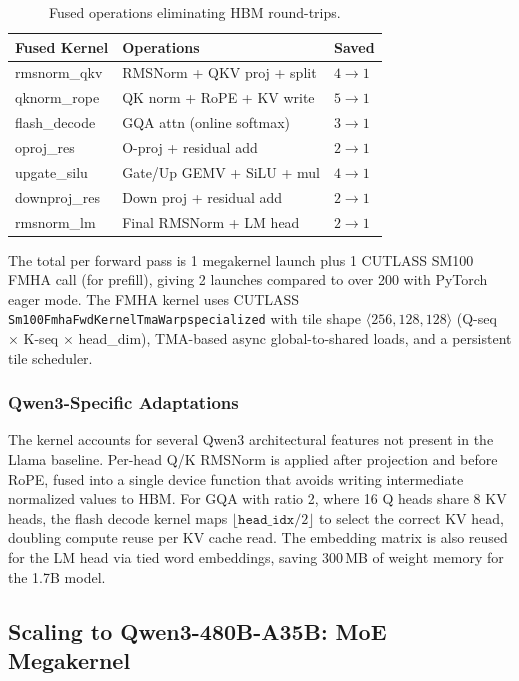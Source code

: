 \documentclass[sigplan,screen]{acmart}
\begin{document}
\begin{table}[h]
  \caption{Fused operations eliminating HBM round-trips.}
  \label{tab:3}
  \small
  \begin{tabular}{lll}
    \toprule
    Fused Kernel & Operations & Saved \\
    \midrule
    rmsnorm\_qkv & RMSNorm + QKV proj + split & $4{\to}1$ \\
    qknorm\_rope & QK norm + RoPE + KV write & $5{\to}1$ \\
    flash\_decode & GQA attn (online softmax) & $3{\to}1$ \\
    oproj\_res & O-proj + residual add & $2{\to}1$ \\
    upgate\_silu & Gate/Up GEMV + SiLU + mul & $4{\to}1$ \\
    downproj\_res & Down proj + residual add & $2{\to}1$ \\
    rmsnorm\_lm & Final RMSNorm + LM head & $2{\to}1$ \\
    \bottomrule
  \end{tabular}
\end{table}

The total per forward pass is 1 megakernel launch plus 1 CUTLASS SM100 FMHA call (for prefill), giving 2 launches compared to over 200 with PyTorch eager mode. The FMHA kernel uses CUTLASS~\cite{cutlass} \texttt{Sm100FmhaFwdKernelTmaWarpspecialized} \newline with tile shape $\langle 256, 128, 128 \rangle$ (Q-seq $\times$ K-seq $\times$ head\_dim), TMA-based async global-to-shared loads, and a persistent tile scheduler.

\subsubsection{Qwen3-Specific Adaptations}

The kernel accounts for several Qwen3 architectural features not present in the Llama baseline. Per-head Q/K RMSNorm is applied after projection and before RoPE, fused into a single device function that avoids writing intermediate normalized values to HBM. For GQA with ratio 2, where 16 Q heads share 8 KV heads, the flash decode kernel maps $\lfloor \texttt{head\_idx} / 2 \rfloor$ to select the correct KV head, doubling compute reuse per KV cache read. The embedding matrix is also reused for the LM head via tied word embeddings, saving 300\,MB of weight memory for the 1.7B model.

\subsection{Scaling to Qwen3-480B-A35B: MoE Megakernel}
\label{sec:moe}
\end{document}
